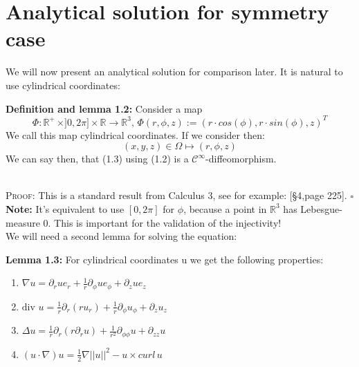 \documentclass[12pt,a4paper]{report}
\newcommand*{\QEDB}{\null\nobreak\hfill\ensuremath{\square}}
\begin{document}
\section{Analytical solution for symmetry case}
We will now present an analytical solution for comparison later. It is natural to use cylindrical coordinates:\\
\colorbox{defblue}{\begin{minipage}{15cm}{\textcolor{black}{}{\label{def1.2}}}
\textbf{Definition and lemma 1.2:} Consider a map
\begin{equation}
    \Phi : \mathbb{R}^+ \,\times ]0,2\pi] \times \mathbb{R} \to \mathbb{R}^3,\,
    \Phi (r,\phi,z):=(r\cdot cos(\phi),r\cdot sin(\phi),z)^T
\end{equation}
We call this map cylindrical coordinates. If we consider then:
\begin{equation}
    (x,y,z) \in \Omega \mapsto (r,\phi,z)
\end{equation}
We can say then, that (1.3) using (1.2) is a \(\mathcal{C}^{\infty}\)-diffeomorphism. 
\end{minipage}}\\

\textsc{Proof:} This is a standard result from Calculus 3, see for example: \cite{ElstrodtAna3}[§4,page 225]. \QEDB\\
\textbf{Note:} It's equivalent to use \([0,2\pi]\) for \(\phi\), because a point in \(\mathbb{R}^3\) has Lebesgue-measure 0. This is important for the validation of the injectivity!\\

We will need a second lemma for solving the equation:\\
\colorbox{lemyellow}{\begin{minipage}{15cm}{\textcolor{black}{}{\label{lem1.3}}}
\textbf{Lemma 1.3:} For cylindrical coordinates u we get the following properties:
\begin{enumerate}
    \item $\nabla u = \partial_rue_r + \frac{1}{r}\partial_{\phi}ue_{\phi} + \partial_zue_z$
    \item $\text{div }u = \frac{1}{r}\partial_r(ru_r) + \frac{1}{r}\partial_{\phi}u_{\phi} + \partial_zu_z$
    \item $\Delta u = \frac{1}{r}\partial_r(r\partial_ru) + \frac{1}{r^2}\partial_{\phi \phi}u + \partial_{zz}u$
    \item $(u \cdot \nabla)u = \frac{1}{2}\nabla ||u||^2 - u \times curl\, u$
\end{enumerate}
\end{minipage}}\\
\end{document}
